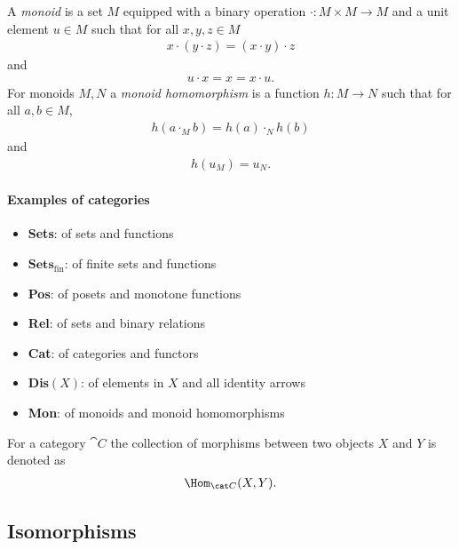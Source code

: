 \documentclass{article}
\begin{document}
\begin{definition}
    A \emph{monoid} is a set $M$ equipped with a binary operation
    $\cdot : M\times M \to M$ and a unit element $u\in M$ such that
    for all $x,y,z\in M$
    \begin{align*}
        x\cdot (y\cdot z) = (x\cdot y) \cdot z
    \end{align*}
    and
    \begin{align*}
        u \cdot x = x = x \cdot u.
    \end{align*}
    For monoids $M,N$ a \emph{monoid homomorphism} is a function
    $h:M\to N$ such that for all $a,b\in M$,
    \begin{align*}
        h(a\cdot_M b) = h(a)\cdot_N h(b)
    \end{align*}
    and
    \begin{align*}
        h(u_M) = u_N.
    \end{align*}
\end{definition}

\paragraph{Examples of categories}
\begin{itemize}
    \item \textbf{Sets}: of sets and functions
    \item $\textbf{Sets}_\text{fin}$: of finite sets and functions
    \item \textbf{Pos}: of posets and monotone functions
    \item \textbf{Rel}: of sets and binary relations
    \item \textbf{Cat}: of categories and functors
    \item \textbf{Dis$(X)$}: of elements in $X$ and all identity arrows
    \item \textbf{Mon}: of monoids and monoid homomorphisms
\end{itemize}

\begin{definition}
    For a category $\cat C$ the collection of morphisms between two objects
    $X$ and $Y$ is denoted as
    \begin{align*}
        \Hom_{\cat C}(X,Y).
    \end{align*}
\end{definition}

\subsection{Isomorphisms}
\end{document}
